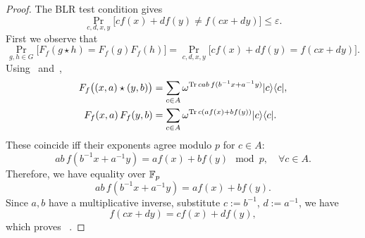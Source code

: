\begin{proof}\leanok
The BLR test condition gives
\[
\Pr_{c,d,x,y}\!\bigl[c f(x) + d f(y) \neq f(cx + dy)\bigr] \leq \varepsilon.
\]
First we observe that
\begin{equation}\label{eq:rep-eq-blr}
\Pr_{g, h \in G}\!\bigl[F_f(g \star h) = F_f(g)F_f(h)\bigr]
= \Pr_{c,d,x,y}\!\bigl[c f(x) + d f(y) = f(cx + dy)\bigr].
\end{equation}
Using~ and~,
\begin{align*}
F_f\bigl((x,a)\star(y,b)\bigr) &= \sum_{c\in A}\omega^{{\rm Tr}\, cab\,f(b^{-1}x + a^{-1}y)} \mbox{$ | c \rangle $}\mbox{$ \langle c | $}, \\
F_f(x, a)\,F_f(y, b) &= \sum_{c\in A} \omega^{{\rm Tr}\, c(af(x) + bf(y))} \mbox{$ | c \rangle $}\mbox{$ \langle c | $}.
\end{align*}
These coincide iff their exponents agree modulo $p$ for $c \in A$: 
\[
ab\, f(b^{-1}x + a^{-1}y) = af(x) + bf(y) \mod p, \quad \forall c \in A.
\]
Therefore, we have equality over $\mathbb{F}_p$ 
\[
ab\, f(b^{-1}x + a^{-1}y) = af(x) + bf(y).
\]
Since $a, b$ have a multiplicative inverse, substitute $c := b^{-1}$, $d := a^{-1}$, we have
\[
f(cx + d y) = c f(x) + d f(y),
\]
which proves ~.


\end{proof}
